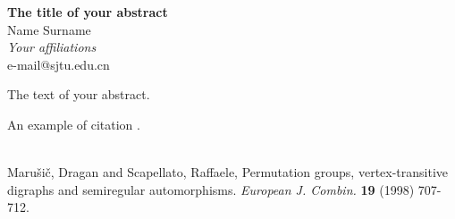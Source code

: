 \documentclass[a4paper,14pt]{article}
\begin{document}
\renewcommand{\refname}{\small{References}}
\thispagestyle{fancy}
\fancyhead{}
\fancyfoot{}
\renewcommand{\footrulewidth}{0.1 mm}

\begin{center}
\textbf{The title of your abstract}\\
\vspace{\baselineskip}
Name Surname\\
\emph{Your affiliations}\\e-mail@sjtu.edu.cn
\vspace{\baselineskip}
\end{center}
\vspace{\baselineskip}

The text of your abstract.

An example of citation \cite{Pi1}. \\
\\
\begin{thebibliography}{99}
\small{Maru\v{s}i\v{c}, Dragan and Scapellato, Raffaele, Permutation groups, vertex-transitive digraphs and semiregular automorphisms. {\it European J. Combin.} \textbf{19} (1998) 707-712.}

\end{thebibliography}
\end{document}
